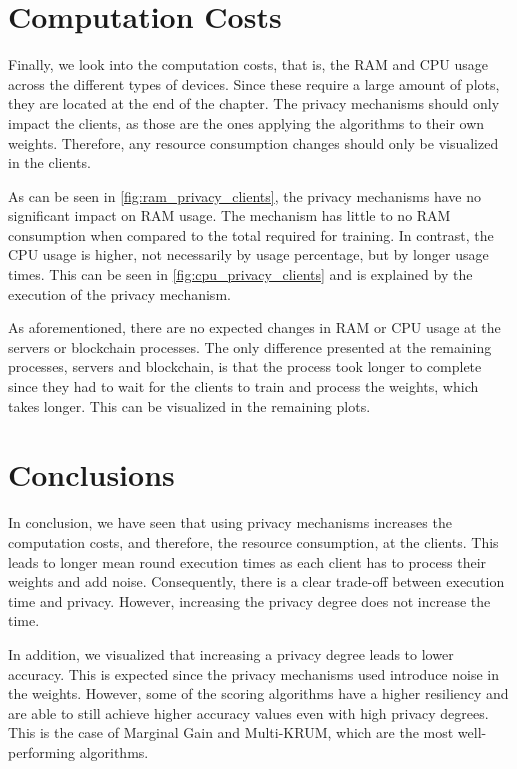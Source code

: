\section{Computation Costs}

Finally, we look into the computation costs, that is, the RAM and CPU usage across the different types of devices. Since these require a large amount of plots, they are located at the end of the chapter. The privacy mechanisms should only impact the clients, as those are the ones applying the algorithms to their own weights. Therefore, any resource consumption changes should only be visualized in the clients.

As can be seen in \autoref{fig:ram_privacy_clients}, the privacy mechanisms have no significant impact on RAM usage. The mechanism has little to no RAM consumption when compared to the total required for training. In contrast, the CPU usage is higher, not necessarily by usage percentage, but by longer usage times. This can be seen in \autoref{fig:cpu_privacy_clients} and is explained by the execution of the privacy mechanism.

As aforementioned, there are no expected changes in RAM or CPU usage at the servers or blockchain processes. The only difference presented at the remaining processes, servers and blockchain, is that the process took longer to complete since they had to wait for the clients to train and process the weights, which takes longer. This can be visualized in the remaining plots.

\section{Conclusions}

In conclusion, we have seen that using privacy mechanisms increases the computation costs, and therefore, the resource consumption, at the clients. This leads to longer mean round execution times as each client has to process their weights and add noise. Consequently, there is a clear trade-off between execution time and privacy. However, increasing the privacy degree does not increase the time.

In addition, we visualized that increasing a privacy degree leads to lower accuracy. This is expected since the privacy mechanisms used introduce noise in the weights. However, some of the scoring algorithms have a higher resiliency and are able to still achieve higher accuracy values even with high privacy degrees. This is the case of Marginal Gain and Multi-KRUM, which are the most well-performing algorithms.

